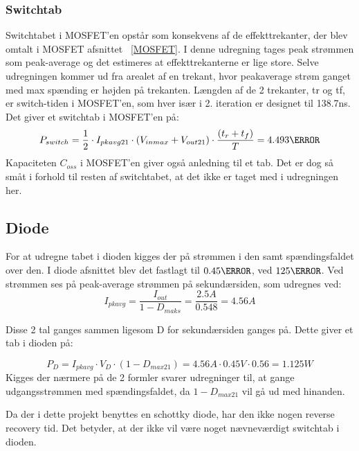 \subsubsection{Switchtab} \label{switchtab2}
Switchtabet i MOSFET'en opstår som konsekvens af de effekttrekanter, der blev omtalt i MOSFET afsnittet ~\ref{MOSFET}. I denne udregning tages peak strømmen som peak-average og det estimeres at effekttrekanterne er lige store. Selve udregningen kommer ud fra arealet af en trekant, hvor peakaverage strøm ganget med max spænding er højden på trekanten. Længden af de 2 trekanter, tr og tf, er switch-tiden i MOSFET'en, som hver især i 2. iteration er designet til 138.7ns. Det giver et switchtab i MOSFET'en på\cite{mosfet-switch2}:
 \begin{equation} \label{P_switch}
 P_{switch} = \frac{1}{2} \cdot I_{pkavg21} \cdot (V_{inmax}+V_{out21}) \cdot \frac{(t_r+t_f)}{T}= 4.493\watt
 \end{equation} 
Kapaciteten $C_{oss}$ i MOSFET'en giver også anledning til et tab. Det er dog så småt i forhold til resten af switchtabet, at det ikke er taget med i udregningen her. 

\subsection{Diode}
For at udregne tabet i dioden kigges der på strømmen i den samt spændingsfaldet over den. I diode afsnittet blev det fastlagt til $0.45\ohm$, ved $125\degreeCelsius$. Ved strømmen ses på peak-average strømmen på sekundærsiden, som udregnes ved:
\begin{equation} \label{I_pk_avg}
I_{pkavg} = \frac{I_{out}}{1-D_{maks}} = \frac{2.5A}{0.548} = 4.56A
\end{equation}

\noindent Disse 2 tal ganges sammen ligesom D for sekundærsiden ganges på. Dette giver et tab i dioden på:

\begin{equation} \label{diodetab}
P_D = I_{pkavg} \cdot V_D \cdot (1-D_{max21}) = 4.56A \cdot 0.45V \cdot 0.56 = 1.125W 
\end{equation}  
Kigges der nærmere på de 2 formler svarer udregninger til, at gange udgangsstrømmen med spændingsfaldet, da $1-D_{max21}$ vil gå ud med hinanden.

\noindent Da der i dette projekt benyttes en schottky diode, har den ikke nogen reverse recovery tid. Det betyder, at der ikke vil være noget nævneværdigt switchtab i dioden. 

